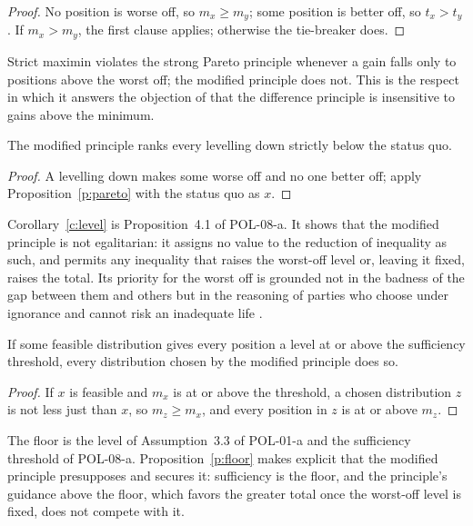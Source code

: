 \documentclass{situationist-preprint}
\begin{document}
\begin{proof}
No position is worse off, so $m_x \geq m_y$; some position is better off, so $t_x > t_y$. If $m_x > m_y$, the first clause applies; otherwise the tie-breaker does.
\end{proof}

Strict maximin violates the strong Pareto principle whenever a gain falls only to positions above the worst off; the modified principle does not. This is the respect in which it answers the objection of \citet{Gustafsson2018} that the difference principle is insensitive to gains above the minimum.

\begin{corollary}\label{c:level}
The modified principle ranks every levelling down strictly below the status quo.
\end{corollary}

\begin{proof}
A levelling down makes some worse off and no one better off; apply Proposition~\ref{p:pareto} with the status quo as $x$.
\end{proof}

Corollary~\ref{c:level} is Proposition~4.1 of POL-08-a. It shows that the modified principle is not egalitarian: it assigns no value to the reduction of inequality as such, and permits any inequality that raises the worst-off level or, leaving it fixed, raises the total. Its priority for the worst off is grounded not in the badness of the gap between them and others but in the reasoning of parties who choose under ignorance and cannot risk an inadequate life \citep{Parfit1997}.

\begin{proposition}\label{p:floor}
If some feasible distribution gives every position a level at or above the sufficiency threshold, every distribution chosen by the modified principle does so.
\end{proposition}

\begin{proof}
If $x$ is feasible and $m_x$ is at or above the threshold, a chosen distribution $z$ is not less just than $x$, so $m_z \geq m_x$, and every position in $z$ is at or above $m_z$.
\end{proof}

The floor is the level of Assumption~3.3 of POL-01-a and the sufficiency threshold of POL-08-a. Proposition~\ref{p:floor} makes explicit that the modified principle presupposes and secures it: sufficiency is the floor, and the principle's guidance above the floor, which favors the greater total once the worst-off level is fixed, does not compete with it.
\end{document}
